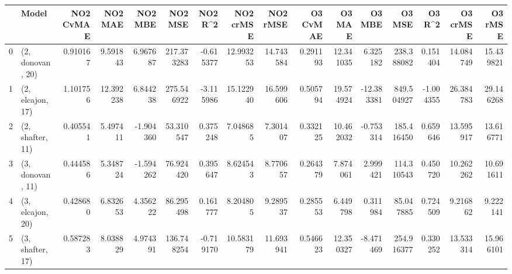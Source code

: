 \begin{tabular}{llrrrrrrrrrrrrrr}
\toprule
{} &             Model &  NO2 CvMAE &    NO2 MAE &   NO2 MBE &     NO2 MSE &   NO2 R\textasciicircum2 &  NO2 crMSE &   NO2 rMSE &  O3 CvMAE &     O3 MAE &     O3 MBE &      O3 MSE &    O3 R\textasciicircum2 &   O3 crMSE &    O3 rMSE \\
\midrule
0 &  (2, donovan, 20) &   0.910167 &   9.591843 &  6.967687 &  217.373283 & -0.615377 &  12.993253 &  14.743584 &  0.291193 &  12.341035 &   6.325182 &  238.388082 &  0.151404 &  14.084749 &  15.439821 \\
1 &  (2, elcajon, 17) &   1.101756 &  12.392238 &  6.844238 &  275.546922 & -3.115986 &  15.122940 &  16.599606 &  0.505794 &  19.574924 & -12.383381 &  849.504927 & -1.004355 &  26.384783 &  29.146268 \\
2 &  (2, shafter, 11) &   0.405541 &   5.497411 & -1.904360 &   53.310547 &  0.375248 &   7.048685 &   7.301407 &  0.332125 &  10.462032 &  -0.753314 &  185.416450 &  0.659646 &  13.595917 &  13.616771 \\
3 &  (3, donovan, 11) &   0.444586 &   5.348724 & -1.594262 &   76.924420 &  0.395647 &   8.624543 &   8.770657 &  0.264379 &   7.874061 &   2.999421 &  114.310543 &  0.450720 &  10.262262 &  10.691611 \\
4 &  (3, elcajon, 20) &   0.428680 &   6.832653 &  4.356222 &   86.295498 &  0.161777 &   8.204805 &   9.289537 &  0.285553 &   6.449798 &   0.311984 &   85.047885 &  0.724509 &   9.216862 &   9.222141 \\
5 &  (3, shafter, 17) &   0.587283 &   8.038829 &  4.974391 &  136.748254 & -0.719170 &  10.583179 &  11.693941 &  0.546623 &  12.350327 &  -8.471469 &  254.916377 &  0.330252 &  13.533314 &  15.966101 \\
\bottomrule
\end{tabular}
